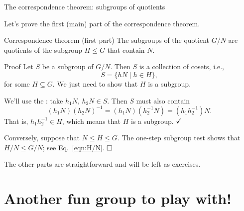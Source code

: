 \documentclass[8pt, handout]{beamer}
\newcommand{\Pause}{}      %
\begin{document}

\begin{frame}{The correspondence theorem: subgroups of quotients} %
  
  Let's prove the first (main) part of the correspondence theorem.
  
  \begin{block}{Correspondence theorem (first part)}
    The subgroups of the quotient $G/N$ are quotients of the
    subgroup $H\leq G$ that contain $N$.
  \end{block}
  
  \begin{exampleblock}{Proof} \pause
    Let $S$ be a subgroup of $G/N$. \Pause Then $S$ is a collection of
    cosets, i.e.,
    \[
    S=\big\{hN\mid h\in H\big\},
    \]
    for some  $H\subseteq G$. \Pause We just need to
    show that $H$ is a subgroup. \medskip\pause

    We'll use the : take
    $h_1N,\,h_2N\in S$. \Pause Then $S$ must also contain
    \begin{equation}\label{eqn:H/N}
    (h_1N)(h_2N)^{-1}=(h_1N)(h_2^{-1}N)=(h_1h_2^{-1})N.
    \end{equation}
    That is, $h_1h_2^{-1}\in H$, which means that $H$ is a
    subgroup. $\hfill\checkmark$ \medskip\pause

    Conversely, suppose that $N\leq H\leq G$. \Pause The one-step subgroup
    test shows that $H/N\leq G/N$; see Eq.~\eqref{eqn:H/N}. $\hfill\Box$
  \end{exampleblock}
  
  \smallskip\Pause
  
  The other parts are straightforward and will be left as exercises.
\end{frame}

\section{Another fun group to play with!}

\end{document}
